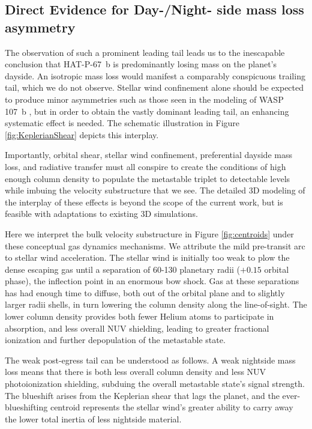 \documentclass[twocolumn]{aastex631}
\begin{document}
\subsection{Direct Evidence for Day-/Night- side mass loss asymmetry}\label{secPrimaFacie}
The observation of such a prominent leading tail leads us to the inescapable conclusion that HAT-P-67~b is predominantly losing mass on the planet's dayside.  An isotropic mass loss would manifest a comparably conspicuous trailing tail, which we do not observe.  Stellar wind confinement alone should be expected to produce minor asymmetries such as those seen in the modeling of WASP 107~b \citep{2022ApJ...926..226M}, but in order to obtain the vastly dominant leading tail, an enhancing systematic effect is needed.  The schematic illustration in Figure \ref{fig:KeplerianShear} depicts this interplay.

Importantly, orbital shear, stellar wind confinement, preferential dayside mass loss, and radiative transfer must all conspire to create the conditions of high enough column density to populate the  metastable triplet to detectable levels while imbuing the velocity substructure that we see.  The detailed 3D modeling of the interplay of these effects is beyond the scope of the current work, but is feasible with adaptations to existing 3D simulations.

Here we interpret the bulk velocity substructure in Figure \ref{fig:centroids} under these conceptual gas dynamics mechanisms.  We attribute the mild pre-transit arc to stellar wind acceleration.  The stellar wind is initially too weak to plow the dense escaping gas until a separation of 60-130 planetary radii ($+0.15$ orbital phase), the inflection point in an enormous bow shock.  Gas at these separations has had enough time to diffuse, both out of the orbital plane and to slightly larger radii shells, in turn lowering the column density along the line-of-sight.  The lower column density provides both fewer Helium atoms to participate in absorption, and less overall NUV shielding, leading to greater fractional ionization and further depopulation of the  metastable state.

The weak post-egress tail can be understood as follows.  A weak nightside mass loss means that there is both less overall column density and less NUV photoionization shielding, subduing the overall  metastable state's signal strength.  The blueshift arises from the Keplerian shear that lags the planet, and the ever-blueshifting centroid represents the stellar wind's greater ability to carry away the lower total inertia of less nightside material.
\end{document}
